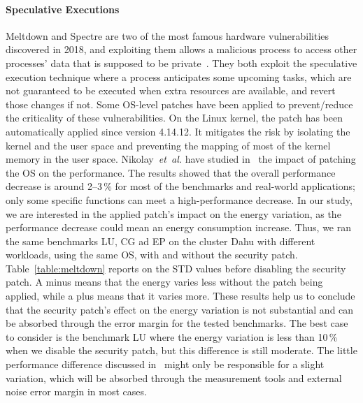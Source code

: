 \paragraph{Speculative Executions}
Meltdown and Spectre are two of the most famous hardware vulnerabilities discovered in 2018, and exploiting them allows a malicious process to access other processes' data that is supposed to be private~\cite{Kocher2018spectre,Lipp2018meltdown}.
They both exploit the speculative execution technique where a process anticipates some upcoming tasks, which are not guaranteed to be executed when extra resources are available, and revert those changes if not.
Some OS-level patches have been applied to prevent/reduce the criticality of these vulnerabilities.
On the Linux kernel, the patch has been automatically applied since version 4.14.12.
It mitigates the risk by isolating the kernel and the user space and preventing the mapping of most of the kernel memory in the user space.
Nikolay~\emph{et~al.} have studied in~\cite{DBLP:journals/corr/abs-1801-04329} the impact of patching the OS on the performance.
The results showed that the overall performance decrease is around 2--3\,\% for most of the benchmarks and real-world applications; only some specific functions can meet a high-performance decrease.
In our study, we are interested in the applied patch's impact on the energy variation, as the performance decrease could mean an energy consumption increase.
Thus, we ran the same benchmarks \textsf{LU}, \textsf{CG} ad \textsf{EP} on the cluster \textsf{Dahu} with different workloads, using the same OS, with and without the security patch.
Table~\ref{table:meltdown} reports on the STD values before disabling the security patch.
A minus means that the energy varies less without the patch being applied, while a plus means that it varies more.
These results help us to conclude that the security patch's effect on the energy variation is not substantial and can be absorbed through the error margin for the tested benchmarks.
The best case to consider is the benchmark \textsf{LU} where the energy variation is less than 10\,\% when we disable the security patch, but this difference is still moderate.
The little performance difference discussed in~\cite{Kocher2018spectre,Lipp2018meltdown} might only be responsible for a slight variation, which will be absorbed through the measurement tools and external noise error margin in most cases.

